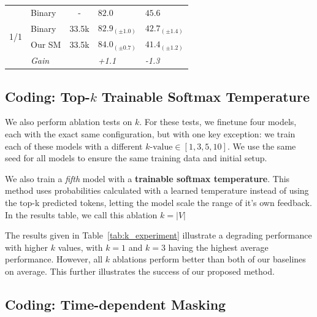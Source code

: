 \documentclass{article}
\newcommand{\gain}[1]{\textit{\color{Green}#1}}
\begin{document}
\begin{table}[h!]
{\begin{tabular}{clcll}
\multirow{4}{*}{1/1}                                 & Binary   & -    &         $82.0$&          $45.6$\\
                                                     & Binary   & 33.5k    &         $82.9_{(\pm 1.0)}$&          $42.7_{(\pm 1.4)}$\\
                                                     & Our SM       & 33.5k   &         $84.0_{(\pm 0.7)}$&          $41.4_{(\pm 1.2)}$\\
                                                     & \quad \textit{Gain}     &         &         \gain{+1.1}&    \textit{-1.3}\\
\bottomrule
\end{tabular}
}
\end{table}






\subsection{Coding: Top-$k$ Trainable Softmax Temperature}\label{app:top-k}
We also perform ablation tests on $k$. For these tests, we finetune four models, each with the exact same configuration, but with one key exception: we train each of these models with a different $k\text{-value} \in [1,3,5,10]$. 
%
We use the same seed for all models to ensure the same training data and initial setup.

We also train a \textit{fifth} model with a \textbf{trainable softmax temperature}. 
%
This method uses probabilities calculated with a learned temperature instead of using the top-k predicted tokens, letting the model scale the range of it's own feedback. 
%
In the results table, we call this ablation $k=|V|$

The results given in Table~\ref{tab:k_experiment} illustrate a degrading performance with higher $k$ values, with $k=1$ and $k=3$ having the highest average performance. 
%
However, all $k$ ablations perform better than both of our baselines on average.
%
This further illustrates the success of our proposed method.



\subsection{Coding: Time-dependent Masking}\label{app:time}
\end{document}
